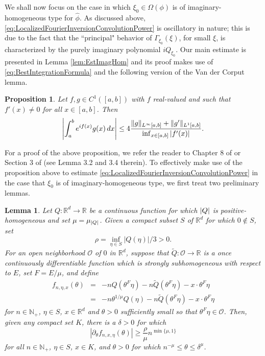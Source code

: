 \documentclass[11pt]{article}
\newtheorem{lemma}[theorem]{Lemma}
\newtheorem{proposition}[theorem]{Proposition}
\theoremstyle{remark}
\begin{document}
\noindent We shall now focus on the case in which $\xi_0\in\Omega(\phi)$ is of imaginary-homogeneous type for $\widehat{\phi}$. As discussed above,  \eqref{eq:LocalizedFourierInversionConvolutionPower} is oscillatory in nature; this is due to the fact that the ``principal" behavior of $\Gamma_{\xi_0}(\xi)$, for small $\xi$, is characterized by the purely imaginary polynomial $iQ_{\xi_0}$. Our main estimate is presented in Lemma \ref{lem:EstImagHom} and its proof makes use of \eqref{eq:BestIntegrationFormula} and the following version of the Van der Corput lemma.

\begin{proposition}\label{prop:VanderCorput}
Let $f,g\in C^1([a,b])$ with $f$ real-valued and such that $f'(x)\neq 0$ for all $x\in [a,b]$. Then
\begin{equation*}
\abs{\int_a^b e^{if(x)}g(x)\,dx}\leq 4\frac{\|g\|_{L^\infty[a,b]}+\|g'\|_{L^1[a,b]}}{\inf_{x\in[a,b]}\abs{f'(x)}}.
\end{equation*}
\end{proposition}

\noindent For a proof of the above proposition, we refer the reader to Chapter 8 of \cite{SteinHarmonicAnalysis} or Section 3 of \cite{Randles2015} (see Lemma 3.2 and 3.4 therein).  To effectively make use of the proposition above to estimate \eqref{eq:LocalizedFourierInversionConvolutionPower} in the case that $\xi_0$ is of imaginary-homogeneous type, we first treat two preliminary lemmas. 

\begin{lemma}\label{lem:PhaseDerivativeEstimate}
Let $Q:\mathbb{R}^d\to\mathbb{R}$ be a continuous function for which $\abs{Q}$ is positive-homogeneous and set $\mu=\mu_{\abs{Q}}$. Given a compact subset $S$ of $\mathbb{R}^d$ for which $0\notin S$, set
\begin{equation*}
    \rho=\inf_{\eta\in S}|Q(\eta)|/3>0.
\end{equation*}
For an open neighborhood $\mathcal{O}$ of $0$ in $\mathbb{R}^d$, suppose that $\widetilde{Q}:\mathcal{O}\to\mathbb{R}$ is a once continuously differentiable function which is strongly subhomogeneous with respect to $E$, set $F=E/\mu$, and define
\begin{eqnarray*}
f_{n,\eta,x}(\theta)&=&-nQ(\theta^F\eta)-n\widetilde{Q}(\theta^F\eta)-x\cdot \theta^F\eta\\
&=&-n\theta^{1/\mu}Q(\eta)-n\widetilde{Q}(\theta^{F}\eta)-x\cdot \theta^{F}\eta
\end{eqnarray*}
for $n\in\mathbb{N}_+$, $\eta\in S$, $x\in\mathbb{R}^d$ and $\theta>0$ sufficiently small so that $\theta^F\eta\in\mathcal{O}$. Then, given any compact set $K$, there is a $\delta>0$ for which
\begin{equation*}
    |\partial_\theta f_{n,x,\eta}(\theta)|\geq \frac{\rho}{\mu} n^{\min\{\mu,1\}}
\end{equation*}
for all $n\in\mathbb{N}_+$, $\eta\in S$,  $x\in K$, and $\theta>0$ for which $n^{-\mu}\leq \theta\leq \delta^\mu$.
\end{lemma}
\end{document}

